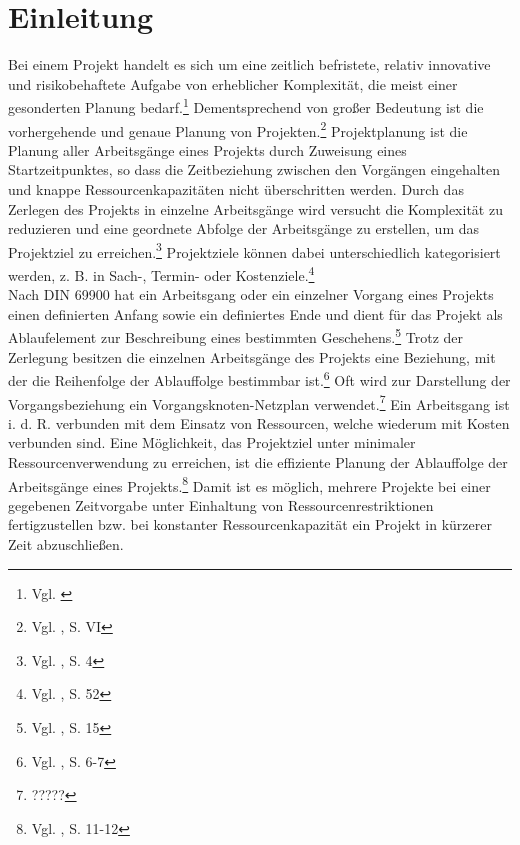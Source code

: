 \documentclass[a4paper,12pt,parskip,bibtotoc,liststotoc]{article}
\begin{document}

\section{Einleitung} \label{start}
Bei einem Projekt handelt es sich um eine zeitlich befristete, relativ innovative und risikobehaftete Aufgabe von erheblicher Komplexität, die meist einer gesonderten Planung bedarf.\footnote{Vgl. \cite{projektdef}} Dementsprechend von großer Bedeutung ist die vorhergehende und genaue Planung von Projekten.\footnote{Vgl. \cite{zimmermann2006projektplanung}, S. VI\label{zum}} Projektplanung ist die Planung aller Arbeitsgänge eines Projekts durch Zuweisung eines Startzeitpunktes, so dass die Zeitbeziehung zwischen den Vorgängen eingehalten und knappe Ressourcenkapazitäten nicht überschritten werden. Durch das Zerlegen des Projekts in einzelne Arbeitsgänge wird versucht die Komplexität zu reduzieren und eine geordnete Abfolge der Arbeitsgänge zu erstellen, um das Projektziel zu erreichen.\footnote{Vgl. \cite{zimmermann2006projektplanung}, S. 4} Projektziele können dabei unterschiedlich kategorisiert werden, z. B. in Sach-, Termin- oder Kostenziele.\footnote{Vgl. \cite{felkai2011analysieren}, S. 52}\\

Nach DIN 69900 hat ein Arbeitsgang oder ein einzelner Vorgang eines Projekts einen definierten Anfang sowie ein definiertes Ende und dient für das Projekt als Ablaufelement zur Beschreibung eines bestimmten Geschehens.\footnote{Vgl. \cite{69900D}, S. 15} Trotz der Zerlegung besitzen die einzelnen Arbeitsgänge des Projekts eine Beziehung, mit der die Reihenfolge der Ablauffolge bestimmbar ist.\footnote{Vgl. \cite{kellenbrink2014einfuhrung}, S. 6-7} Oft wird zur Darstellung der Vorgangsbeziehung ein Vorgangsknoten-Netzplan verwendet.\footnote{?????} %
Ein Arbeitsgang ist i. d. R. verbunden mit dem Einsatz von Ressourcen, welche wiederum mit Kosten verbunden sind. Eine Möglichkeit, das Projektziel unter minimaler Ressourcenverwendung zu erreichen, ist die effiziente Planung der Ablauffolge der Arbeitsgänge eines Projekts.\footnote{Vgl. \cite{bartels2009projektplanung}, S. 11-12} Damit ist es möglich, mehrere Projekte bei einer gegebenen Zeitvorgabe unter Einhaltung von Ressourcenrestriktionen fertigzustellen bzw. bei konstanter Ressourcenkapazität ein Projekt in kürzerer Zeit abzuschließen. \\
\end{document}
